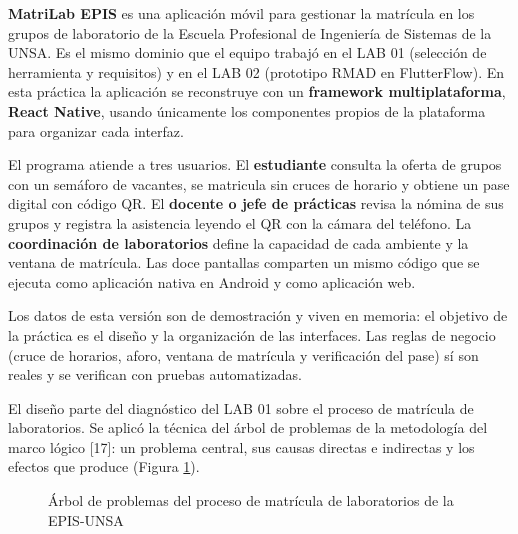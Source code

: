 
\vspace{0.2cm}

\textbf{MatriLab EPIS} es una aplicación móvil para gestionar la matrícula en los grupos de laboratorio de la Escuela Profesional de Ingeniería de Sistemas de la UNSA. Es el mismo dominio que el equipo trabajó en el LAB 01 (selección de herramienta y requisitos) y en el LAB 02 (prototipo RMAD en FlutterFlow). En esta práctica la aplicación se reconstruye con un \textbf{framework multiplataforma}, \textbf{React Native}, usando únicamente los componentes propios de la plataforma para organizar cada interfaz.

El programa atiende a tres usuarios. El \textbf{estudiante} consulta la oferta de grupos con un semáforo de vacantes, se matricula sin cruces de horario y obtiene un pase digital con código QR. El \textbf{docente o jefe de prácticas} revisa la nómina de sus grupos y registra la asistencia leyendo el QR con la cámara del teléfono. La \textbf{coordinación de laboratorios} define la capacidad de cada ambiente y la ventana de matrícula. Las doce pantallas comparten un mismo código que se ejecuta como aplicación nativa en Android y como aplicación web.

Los datos de esta versión son de demostración y viven en memoria: el objetivo de la práctica es el diseño y la organización de las interfaces. Las reglas de negocio (cruce de horarios, aforo, ventana de matrícula y verificación del pase) sí son reales y se verifican con pruebas automatizadas.

\vspace{0.2cm}

El diseño parte del diagnóstico del LAB 01 sobre el proceso de matrícula de laboratorios. Se aplicó la técnica del árbol de problemas de la metodología del marco lógico [17]: un problema central, sus causas directas e indirectas y los efectos que produce (Figura \ref{fig:arbol_problemas}).

\begin{figure}[!htbp]
\centering
{}
\caption{Árbol de problemas del proceso de matrícula de laboratorios de la EPIS-UNSA}
\label{fig:arbol_problemas}
\end{figure}

